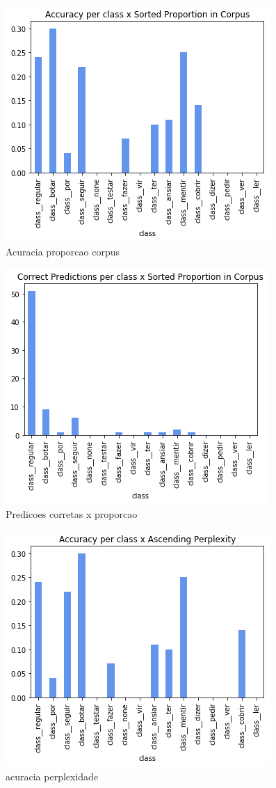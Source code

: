 \begin{figure}[H]
  \centering
  \includegraphics[width=0.7\linewidth]{img/best_file_accuracy.png}
  \caption{Acuracia proporcao corpus}
  \label{fig:acuraciaprop}
\end{figure}



\begin{figure}[H]
  \centering
  \includegraphics[width=0.7\linewidth]{img/best_file_correct_p.png}
  \caption{Predicoes corretas x proporcao}
  \label{fig:predicxprop}
\end{figure}

\begin{figure}[H]
  \centering
  \includegraphics[width=0.7\linewidth]{img/best_file_acuracy_perplexity.png}
  \caption{acuracia perplexidade}
  \label{fig:acuper}
\end{figure}

